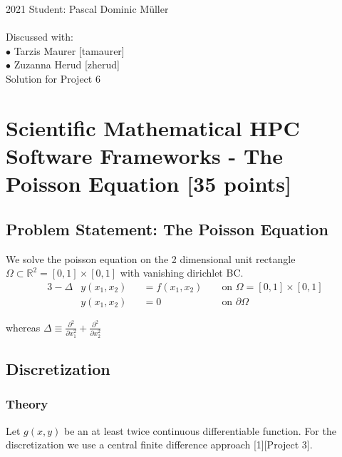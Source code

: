 \documentclass[unicode,11pt,a4paper,oneside,numbers=endperiod,openany]{scrartcl}
\begin{document}
\setassignment
{}

    {2021}
    {Student: Pascal Dominic Müller}
    {\\ \\ Discussed with: \\
        $\bullet$ Tarzis Maurer [tamaurer] \\
        $\bullet$ Zuzanna Herud [zherud] \\
    }
    {Solution for Project 6}
    {}
\newline

\assignmentpolicy


\section{Scientific Mathematical HPC Software Frameworks - The Poisson Equation [35 points]}

\subsection{Problem Statement: The Poisson Equation}

We solve the poisson equation on the 2 dimensional unit rectangle
$\Omega \subset \mathbb R^2=[0,1] \times [0,1]$ with vanishing dirichlet BC.
\begin{alignat}{3}
  -\Delta &y(x_1, x_2) &&= f(x_1, x_2) &&\text{  on  } \Omega = [0,1] \times [0,1]\\
          &y(x_1, x_2) &&= 0 &&\text{  on  } \partial \Omega
\end{alignat}

whereas $\Delta \equiv \frac{\partial^2}{\partial x_1^2} + \frac{\partial^2}{\partial x_2^2}$

\subsection{Discretization}


\subsubsection{Theory}
Let $g(x,y)$ be an at least twice continuous differentiable function. For the
discretization we use a central finite difference approach [1][Project 3].
\end{document}
